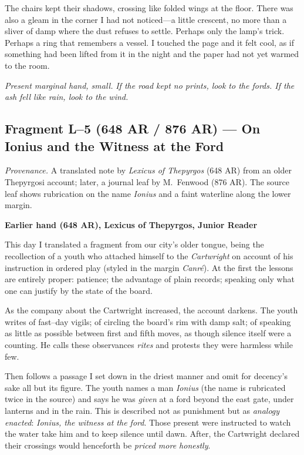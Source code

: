 \documentclass[11pt]{article}
\numberwithin{equation}{section} %
\theoremstyle{plain} %
\theoremstyle{definition} %
\theoremstyle{remark} %
\begin{document}
The chairs kept their shadows, crossing like folded wings at the floor. There was also a gleam in the corner I had not noticed---a little crescent, no more than a sliver of damp where the dust refuses to settle. Perhaps only the lamp's trick. Perhaps a ring that remembers a vessel. I touched the page and it felt cool, as if something had been lifted from it in the night and the paper had not yet warmed to the room.

\medskip
\noindent\textit{Present marginal hand, small.} \emph{If the road kept no prints, look to the fords. If the ash fell like rain, look to the wind.}
\subsection{Fragment L--5 (648 AR / 876 AR) --- On Ionius and the Witness at the Ford}
\label{frag:l5}

\noindent\textit{Provenance.} A translated note by \textit{Lexicus of Thepyrgos} (648 AR) from an older Thepyrgosi account; later, a journal leaf by M.\ Fenwood (876 AR). The source leaf shows rubrication on the name \emph{Ionius} and a faint waterline along the lower margin.

\medskip
\noindent\textbf{Earlier hand (648 AR), Lexicus of Thepyrgos, Junior Reader}

This day I translated a fragment from our city's older tongue, being the recollection of a youth who attached himself to the \textit{Cartwright} on account of his instruction in ordered play (styled in the margin \textit{Canr\'e}). At the first the lessons are entirely proper: patience; the advantage of plain records; speaking only what one can justify by the state of the board.

As the company about the Cartwright increased, the account darkens. The youth writes of fast--day vigils; of circling the board's rim with damp salt; of speaking as little as possible between first and fifth moves, as though silence itself were a counting. He calls these observances \textit{rites} and protests they were harmless while few.

Then follows a passage I set down in the driest manner and omit for decency's sake all but its figure. The youth names a man \emph{Ionius} (the name is rubricated twice in the source) and says he was \emph{given} at a ford beyond the east gate, under lanterns and in the rain. This is described not as punishment but as \emph{analogy enacted}: \textit{Ionius, the witness at the ford}. Those present were instructed to watch the water take him and to keep silence until dawn. After, the Cartwright declared their crossings would henceforth be \emph{priced more honestly}.
\end{document}
